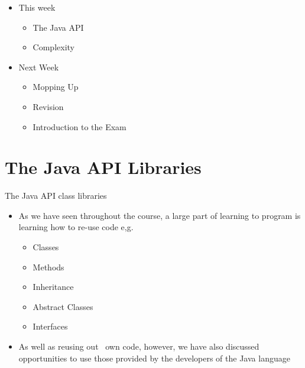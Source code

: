 \documentclass{beamer}
\begin{document}
\begin{frame}

\begin{itemize}
\item This week 
\begin{itemize}
\item The Java API
\item Complexity
\end{itemize}
\end{itemize}
\end{frame}

\begin{frame}
\begin{itemize}
\item Next Week
\begin{itemize}
\item Mopping Up
\item Revision
\item Introduction to the Exam
\end{itemize}
\end{itemize}
\end{frame}

\section{The Java API Libraries}

\begin{frame}
The Java API class libraries
\begin{itemize}
\item As we have seen throughout the course, a large part of learning to program is learning how to re-use code e,g.

\begin{itemize}
\item Classes
\item Methods
\item Inheritance
\item Abstract Classes
\item Interfaces
\end{itemize}
\item As well as reusing out \ own code, however, we have also discussed opportunities to use those provided by the
developers of the Java language
\end{itemize}
\end{frame}
\end{document}
